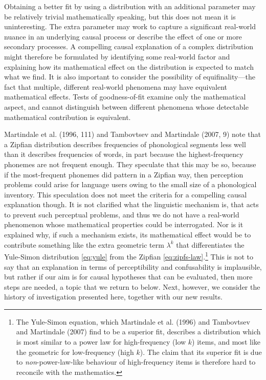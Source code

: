 Obtaining a better fit by using a distribution with an additional parameter may be relatively trivial mathematically speaking, but this does not mean it is uninteresting. The extra parameter may work to capture a significant real-world nuance in an underlying causal process or describe the effect of one or more secondary processes. A compelling causal explanation of a complex distribution might therefore be formulated by identifying some real-world factor and explaining how its mathematical effect on the distribution is expected to match what we find. It is also important to consider the possibility of equifinality---the fact that multiple, different real-world phenomena may have equivalent mathematical effects. Tests of goodness-of-fit examine only the mathematical aspect, and cannot distinguish between different phenomena whose detectable mathematical contribution is equivalent.

Martindale et al. (1996, 111) and Tambovtsev and Martindale (2007, 9) note that a Zipfian distribution describes frequencies of phonological segments less well than it describes frequencies of words, in part because the highest-frequency phonemes are not frequent enough. They speculate that this may be so, because if the most-frequent phonemes did pattern in a Zipfian way, then perception problems could arise for language users owing to the small size of a phonological inventory. This speculation does not meet the criteria for a compelling causal explanation though. It is not clarified what the linguistic mechanism is, that acts to prevent such perceptual problems, and thus we do not have a real-world phenomenon whose mathematical properties could be interrogated. Nor is it explained why, if such a mechanism exists, its mathematical effect would be to contribute something like the extra geometric term \(\lambda^k\) that differentiates the Yule-Simon distribution \eqref{eq:yule} from the Zipfian \eqref{eq:zipfs-law}.\footnote{The Yule-Simon equation, which Martindale et al. (1996) and Tambovtsev and Martindale (2007) find to be a superior fit, describes a distribution which is most similar to a power law for high-frequency (low \(k\)) items, and most like the geometric for low-frequency (high \(k\)). The claim that its superior fit is due to \emph{non}-power-law-like behaviour of high-frequency items is therefore hard to reconcile with the mathematics.} This is not to say that an explanation in terms of perceptibility and confusability is implausible, but rather if our aim is for causal hypotheses that can be evaluated, then more steps are needed, a topic that we return to below. Next, however, we consider the history of investigation presented here, together with our new results. \newline

